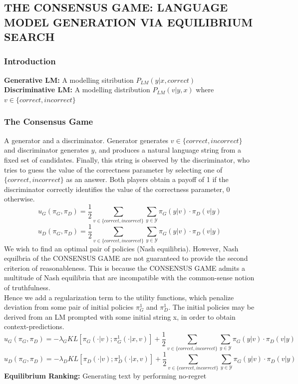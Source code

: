 \documentclass[12pt]{article}
\begin{document}
\subsection{THE CONSENSUS GAME: LANGUAGE MODEL
GENERATION VIA EQUILIBRIUM SEARCH}
\subsubsection{Introduction}
\textbf{Generative LM:} A modelling sitribution $P_{LM}(y|x,correct)$\\
\textbf{Discriminative LM:} A modelling distribution $P_{LM}(v|y,x)$ where $v\in\{correct, incorrect\}$
\subsubsection{The Consensus Game}
A generator and a discriminator. Generator generates $v\in\{correct, incorrect\}$ and discriminator generates $y$, and produces a natural language string from a fixed set of candidates. Finally,
this string is observed by the discriminator, who tries to guess the value of the correctness
parameter by selecting one of $\{correct, incorrect\}$ as an answer. Both players obtain a payoff of
1 if the discriminator correctly identifies the value of the correctness parameter, 0 otherwise.
\[u_G(\pi_G,\pi_D)=\dfrac{1}{2}\sum_{v\in\{corrcet,incorrect\}}\sum_{y\in\mathcal{Y}}\pi_G(y|v)\cdot\pi_D(v|y)\]
\[u_D(\pi_G,\pi_D)=\dfrac{1}{2}\sum_{v\in\{corrcet,incorrect\}}\sum_{y\in\mathcal{Y}}\pi_G(y|v)\cdot\pi_D(v|y)\]
We wish to find an optimal pair of policies (Nash equilibria). However, Nash equilbria of the CONSENSUS GAME are not guaranteed to provide the second criterion
of reasonableness. This is because the CONSENSUS GAME admits a multitude of Nash equilibria that
are incompatible with the common-sense notion of truthfulness.\\
Hence we add a regularization term to the utility functions, which penalize deviation from some pair of initial policies $\pi_G^1$ and $\pi_D^1$. The initial policies may be derived from an LM prompted
with some initial string x, in order to obtain context-predictions.
\[u_G(\pi_G,\pi_D)=-\lambda_GKL\left[\pi_G(\cdot|v);\pi_G^1(\cdot|x,v)\right]+\dfrac{1}{2}\sum_{v\in\{corrcet,incorrect\}}\sum_{y\in\mathcal{Y}}\pi_G(y|v)\cdot\pi_D(v|y)\]
\[u_D(\pi_G,\pi_D)=-\lambda_DKL\left[\pi_D(\cdot|v);\pi_D^1(\cdot|x,v)\right]+\dfrac{1}{2}\sum_{v\in\{corrcet,incorrect\}}\sum_{y\in\mathcal{Y}}\pi_G(y|v)\cdot\pi_D(v|y)\]
\textbf{Equilibrium Ranking:} Generating text by performing no-regret
\end{document}
